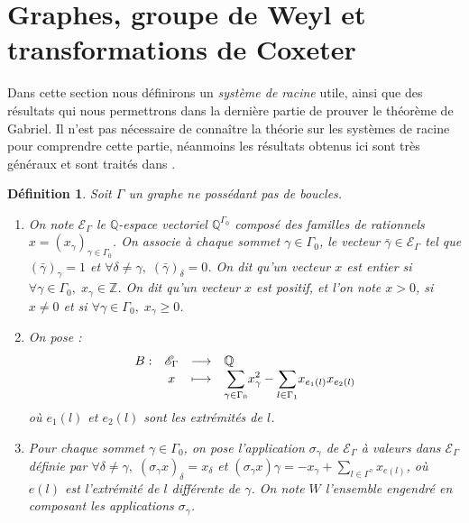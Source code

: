 \documentclass[a4paper,11pt]{article}
\newtheorem{defi}[thm]{Définition}%
\newcommand{\dps}{\displaystyle}
\begin{document}
\section{Graphes, groupe de Weyl et transformations de Coxeter}
\label{rootz}
Dans cette section nous définirons un \emph{système de racine} utile, ainsi que des résultats qui nous permettrons dans la dernière partie de prouver le théorème de Gabriel. Il n'est pas nécessaire de connaître la théorie sur les systèmes de racine pour comprendre cette partie, néanmoins les résultats obtenus ici sont très généraux et sont traités dans \cite{S66}.%
		\begin{defi}
		Soit $\Gamma$ un graphe ne possédant pas de boucles.
		\begin{enumerate}
			\item On note $\mathscr E_{\Gamma}$ le $\mathbb Q$-espace vectoriel $\mathbb Q^{\Gamma_0}$ composé des familles de rationnels $x=(x_\gamma)_{\gamma\in\Gamma_0}$. On associe à chaque sommet $\gamma\in\Gamma_0$, le vecteur $\bar{\gamma}\in\mathscr E_\Gamma$ tel que $(\bar\gamma)_\gamma=1$ et $\forall \delta\neq\gamma,\;(\bar\gamma)_\delta=0$. On dit qu'un vecteur $x$ est \emph{entier} si $\forall\gamma\in\Gamma_{0},\;x_\gamma\in\mathbb Z$. On dit qu'un vecteur $x$ est \emph{positif}, et l'on note $x>0$, si $x\neq0$ et si $\forall\gamma\in\Gamma_0,\;x_\gamma\geq0$.
			\item On pose :
				\[
					\begin{array}{rcc>{\dps}l}
					B:&\mathscr E_{\Gamma}&\longrightarrow&\mathbb Q\\
					&x&\longmapsto&\underset{\gamma\in\Gamma_0}{\sum} x_\gamma^2-\underset{l\in\Gamma_1}{\sum}x_{e_1(l)}x_{e_2(l)}\\
				\end{array}
			\]
			où $e_1(l)$ et $e_2(l)$ sont les extrémités de $l$.
		\item Pour chaque sommet $\gamma\in\Gamma_0$, on pose l'application $\sigma_\gamma$ de $\mathscr E_\Gamma$ à valeurs dans $\mathscr E_\Gamma$ définie par $\forall\delta\neq\gamma,\; (\sigma_\gamma x)_\delta=x_\delta$ et $(\sigma_\gamma x)\gamma=-x_\gamma+\sum_{l\in\Gamma^\gamma}x_{e(l)}$, où $e(l)$ est l'extrémité de $l$ différente de $\gamma$. On note $W$ l'ensemble engendré en composant les applications $\sigma_\gamma$.
		\end{enumerate}
		\end{defi}
\end{document}
